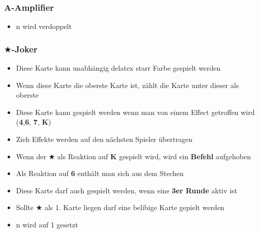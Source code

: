 \documentclass[10pt,a4paper]{article}
\begin{document}
\subsubsection{A-Amplifier}\label{a-amplifier}

\begin{itemize}
\item
  n wird verdoppelt
\end{itemize}

\subsubsection{$\bigstar$-Joker}\label{joker}

\begin{itemize}
\item
  Diese Karte kann unabhängig delatex starr Farbe gespielt werden
\item
  Wenn diese Karte die oberste Karte ist, zählt die Karte unter dieser
  als oberste
\item
  Diese Karte kann gespielt werden wenn man von einem Effect getroffen
  wird (\textbf{4},\textbf{6}, \textbf{7}, \textbf{K})
\item
  Zieh Effekte werden auf den nächsten Spieler übertragen
\item
  Wenn der \textbf{$\bigstar$} als Reaktion auf \textbf{K} gespielt wird, wird
  ein \textbf{Befehl} aufgehoben
\item
  Als Reaktion auf \textbf{6} enthält man sich aus dem Stechen
\item
  Diese Karte darf auch gespielt werden, wenn eine \textbf{3er Runde}
  aktiv ist
\item
  Sollte $\bigstar$ als 1. Karte liegen darf eine belibige Karte gepielt werden
\item
  n wird auf 1 gesetzt
\end{itemize}
\end{document}
